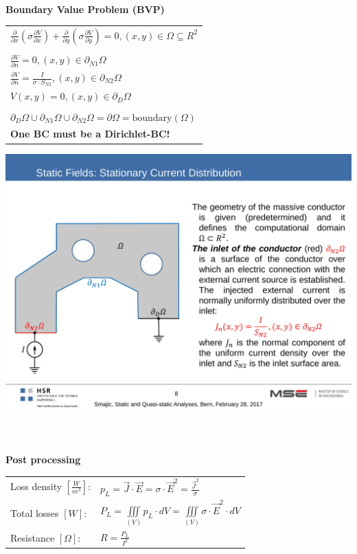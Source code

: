 \textbf{\\ Boundary Value Problem (BVP)\\}
\begin{minipage}[lt]{11cm}
	\begin{tabular}{l}
		\(\displaystyle \frac{\partial}{\partial x}\left(\sigma \frac{\partial V}{\partial x}\right) +\frac{\partial}{\partial y}\left(\sigma \frac{\partial V}{\partial y}\right)
		= 0, \left(x,y\right) \in \Omega \subseteq R^2 \) \\ \\
		\(\displaystyle \frac{\partial V}{\partial n} = 0, \left(x,y\right) \in \partial_{N1} \Omega\) \\
		\(\displaystyle \frac{\partial V}{\partial n} = \frac{I}{\sigma \cdot S_{N2}}, \left(x,y\right) \in \partial_{N2} \Omega\) \\
		\(\displaystyle V\left(x,y\right) = 0, \left(x,y\right) \in \partial_D \Omega\)\\ \\
		
		\(\displaystyle \partial_D\Omega\cup\partial_{N1}\Omega\cup\partial_{N2}\Omega = \partial\Omega = \text{boundary}(\Omega) \)\\
		\textbf{One BC must be a Dirichlet-BC!}
	\end{tabular}
\end{minipage}
\begin{minipage}[rt]{8cm}
	\includegraphics[width=.8\textwidth]{./images/CurrentDistribution.pdf}
\end{minipage}

\textbf{\\ \\ Post processing \\ }
\begin{tabular}{ll}
	Loss density $\left[\frac{W}{m^3}\right]$: & \(\displaystyle p_L = \vec{J} \cdot \vec{E} = \sigma \cdot \vec{E}^2 = \frac{\vec{J}^2}{\sigma} \)\\
	Total losses $[W]$: & \(\displaystyle P_L = \iiint\limits_{\left(V\right)} p_L \cdot dV = \iiint\limits_{\left(V\right)} \sigma \cdot \vec{E}^2 \cdot dV \) \\
	Resistance $[\Omega]$: & \(\displaystyle R = \frac{P_L}{I^2}\) \\
\end{tabular}